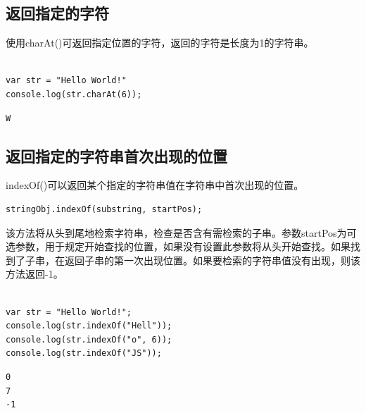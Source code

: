 \subsection{返回指定的字符}

使用charAt()可返回指定位置的字符，返回的字符是长度为1的字符串。 \\

 \\

\begin{lstlisting}[style=htmlcssjs]
var str = "Hello World!"
console.log(str.charAt(6));
\end{lstlisting}

\begin{tcolorbox}
	\begin{verbatim}
W
	\end{verbatim}
\end{tcolorbox}

\subsection{返回指定的字符串首次出现的位置}

indexOf()可以返回某个指定的字符串值在字符串中首次出现的位置。 \\

\begin{lstlisting}[style=htmlcssjs]
stringObj.indexOf(substring, startPos);
\end{lstlisting}

该方法将从头到尾地检索字符串，检查是否含有需检索的子串。参数startPos为可选参数，用于规定开始查找的位置，如果没有设置此参数将从头开始查找。如果找到了子串，在返回子串的第一次出现位置。如果要检索的字符串值没有出现，则该方法返回-1。 \\

 \\

\begin{lstlisting}[style=htmlcssjs]
var str = "Hello World!";
console.log(str.indexOf("Hell"));
console.log(str.indexOf("o", 6));
console.log(str.indexOf("JS"));
\end{lstlisting}

\begin{tcolorbox}
	\begin{verbatim}
0
7
-1
	\end{verbatim}
\end{tcolorbox}

